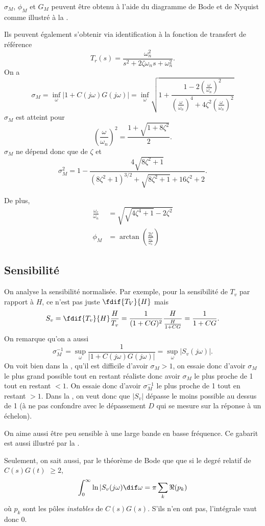 $\sigma_M$, $\phi_M$ et $G_M$ peuvent être obtenu à l'aide
du diagramme de Bode et de Nyquist comme illustré à la .

Ils peuvent également s'obtenir via identification à la fonction
de transfert de référence
\[ T_r(s) = \frac{\omega_n^2}{s^2 + 2 \zeta \omega_n s + \omega_n^2}. \]
On a
\[ \sigma_M = \inf_\omega \left|1 + C(j\omega)G(j\omega)\right| =
\inf_\omega \sqrt{1 + \frac{1 - 2\left(\frac{\omega}{\omega_n}\right)^2}{\left(\frac{\omega}{\omega_n}\right)^4 + 4\zeta^2\left(\frac{\omega}{\omega_n}\right)^2}} \]
$\sigma_M$ est atteint pour
\[ \left(\frac{\omega}{\omega_n}\right)^2 = \frac{1 + \sqrt{1 + 8\zeta^2}}{2}. \]
$\sigma_M$ ne dépend donc que de $\zeta$ et
\[ \sigma_M^2 = 1 - \frac{4\sqrt{8\zeta^2+1}}{(8\zeta^2+1)^{3/2}+\sqrt{8\zeta^2+1}+16\zeta^2+2}. \]

De plus,
\begin{align*}
  \frac{\omega_c}{\omega_n} & = \sqrt{\sqrt{4\zeta^4 + 1} - 2\zeta^2}\\
  \phi_M & = \arctan\left(\frac{2\zeta}{\frac{\omega_c}{\omega_n}}\right)
\end{align*}

\subsection{Sensibilité}
On analyse la sensibilité normalisée.
Par exemple, pour la sensibilité de $T_v$ par rapport à $H$,
ce n'est pas juste $\fdif{T_V}{H}$ mais
\[ S_v = \fdif{T_v}{H} \frac{H}{T_v} = \frac{1}{(1 + CG)^2}\frac{H}{\frac{H}{1+CG}} = \frac{1}{1+CG}. \]
On remarque qu'on a aussi
\[ \sigma_M^{-1} = \sup_\omega\frac{1}{|1+C(j\omega)G(j\omega)|}
= \sup_\omega |S_v(j\omega)|. \]
On voit bien dans la ,
qu'il est difficile d'avoir $\sigma_M > 1$, on essaie donc d'avoir $\sigma_M$
le plus grand possible tout en restant réaliste donc avoir $\sigma_M$ le plus proche
de 1 tout en restant $< 1$.
On essaie donc d'avoir $\sigma_M^{-1}$ le plus proche de 1 tout en restant $> 1$.
Dans la , on veut donc que $|S_v|$ dépasse le moins possible
au dessus de 1 (à ne pas confondre avec le dépassement $D$ qui se mesure sur la réponse
à un échelon).

On aime aussi être peu sensible à une large bande en basse fréquence.
Ce gabarit est aussi illustré par la .

Seulement, on sait aussi,
par le théorème de Bode\cite[p.~336]{astrom2010feedback}
que que si le degré relatif de $C(s)G(t)$ $\geq 2$,
\[ \int_0^\infty \ln|S_v(j\omega) \dif \omega = \pi \sum_k \Re(p_k) \]
où $p_k$ sont les pôles \emph{instables} de $C(s)G(s)$.
S'ils n'en ont pas, l'intégrale vaut donc 0.

